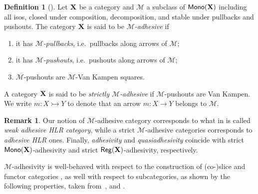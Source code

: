 \documentclass[a4paper,UKenglish,cleveref,pdftex,amsthm,thm-restate,numberwithinsect]{cas-sc}
\theoremstyle{plain}
\theoremstyle{definition}
\newtheorem{definition}[theorem]{Definition}
\newtheorem{remark}[theorem]{Remark}
\def\X{\textbf {\textup{X}}}
\newcommand{\mon}{\mathsf{Mono}}
\newcommand{\reg}{\mathsf{Reg}}
\newcommand{\mto}{\rightarrowtail}
\begin{document}
\begin{definition}[\cite{azzi2019essence,ehrig2012,ehrig2014adhesive,lack2005adhesive,heindel2009category}]
	Let $\X$ be a category and $\mathcal{M}$ a subclass of
	$\mon(\X)$  including  all isos, closed under composition, decomposition,  and stable under pullbacks and pushouts.  The category  $\X$ is said to be \emph{$\mathcal{M}$-adhesive} if
	\begin{enumerate}
		\item it has \emph{$\mathcal{M}$-pullbacks}, i.e.~pullbacks along arrows of $\mathcal{M}$;
		\item it has \emph{$\mathcal{M}$-pushouts}, i.e.~pushouts along arrows of $\mathcal{M}$;
		\item  $\mathcal{M}$-pushouts are $\mathcal{M}$-Van Kampen squares.
	\end{enumerate}
	A category $\X$ is said to be \emph{strictly $\mathcal{M}$-adhesive}
	if $\mathcal{M}$-pushouts are Van Kampen. We write $m\colon X \mto Y$ to denote that an arrow $m\colon X\to Y$ belongs to $\mathcal{M}$.
\end{definition}



\begin{remark}
	\label{rem:salva} Our notion of $\mathcal{M}$-adhesive category corresponds to what in \cite{ehrig2006fundamentals} is called \emph{weak adhesive HLR category}, while a strict $\mathcal{M}$-adhesive categories corresponds to \emph{adhesive HLR} ones. Finally, 	\emph{adhesivity} and \emph{quasiadhesivity} 
	\cite{lack2005adhesive,garner2012axioms} coincide with strict
	$\mon(\X) $-adhesivity and strict $\reg(\X)$-adhesivity,
	respectively. %
\end{remark}


$\mathcal{M}$-adhesivity is well-behaved with respect to  the construction of (co-)slice and functor categories \cite{mac2013categories}, as well with respect to subcategories, as shown by the following properties, taken from~\cite[Thm.~4.15]{ehrig2006fundamentals}, \cite[Prop.~3.5]{lack2005adhesive} and  \cite[Thm.~2.12]{CastelnovoGM24}.
\end{document}
